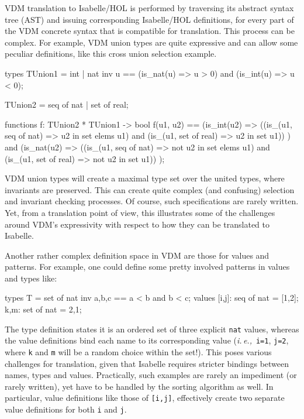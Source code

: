 \documentclass[runningheads,a4paper]{llncs}
\newcommand{\ie}{{\em i.\,e.,\/}}
\begin{document}
VDM translation to Isabelle/HOL is performed by traversing its abstract syntax tree (AST) and issuing corresponding Isabelle/HOL definitions, for every part of the VDM concrete syntax that is compatible for translation. This process can be complex. For example, VDM union types are quite expressive and can allow some peculiar definitions, like this cross union selection example.
%
\begin{vdmsl}[frame=none,basicstyle=\ttfamily\scriptsize]
    types
        TUnion1 = int | nat
        inv u == (is_nat(u) => u > 0) and (is_int(u) => u < 0);

        TUnion2 = seq of nat | set of real;

    functions 
        f: TUnion2 * TUnion1 -> bool
        f(u1, u2) ==
            (is_int(u2) => 
                ((is_(u1, seq of nat) => u2 in set elems u1)
                  and
                 (is_(u1, set of real) => u2 in set u1))
            )
            and
            (is_nat(u2) => 
                ((is_(u1, seq of nat) => not u2 in set elems u1)
                  and
                 (is_(u1, set of real) => not u2 in set u1))
            );
\end{vdmsl}
%
VDM union types will create a maximal type set over the united types, where invariants are preserved. This can create quite complex (and confusing) selection and invariant checking processes. Of course, such specifications are rarely written. Yet, from a translation point of view, this illustrates some of the challenges around VDM's expressivity with respect to how they can be translated to Isabelle. 

Another rather complex definition space in VDM are those for values and patterns. For example, one could define some pretty involved patterns in values and types like:
%
\begin{vdmsl}[frame=none,basicstyle=\ttfamily\scriptsize]
    types
        T = set of nat inv {a,b,c} == a < b and b < c;
    values 
        [i,j]: seq of nat = [1,2];
        {k,m}: set of nat = {2,1};
\end{vdmsl}
%
The type definition states it is an ordered set of three explicit \verb'nat' values, whereas the value definitions bind each name to its corresponding value (\ie~\verb'i=1', \verb'j=2', where \verb'k' and \verb'm' will be a random choice within the set!). This poses various challenges for translation, given that Isabelle requires stricter bindings between names, types and values. Practically, such examples are rarely an impediment (or rarely written), yet have to be handled by the sorting algorithm as well. In particular, value definitions like those of \verb'[i,j]', effectively create two separate value definitions for both \verb'i' and \verb'j'.   
\end{document}
